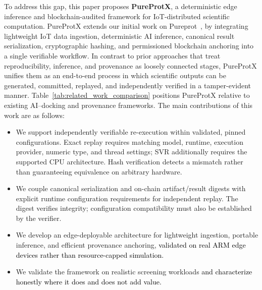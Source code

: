 \documentclass[conference]{IEEEtran}
\newcommand{\rev}[2]{#2}
\begin{document}
To address this gap, this paper proposes \textbf{PureProtX}, a deterministic edge inference and blockchain-audited framework for IoT-distributed scientific computation. PureProtX extends our initial work on Pureprot~\cite{kanu2025pureprot}, by integrating lightweight IoT data ingestion, deterministic AI inference, canonical result serialization, cryptographic hashing, and permissioned blockchain anchoring into a single verifiable workflow. In contrast to prior approaches that treat reproducibility, inference, and provenance as loosely connected stages, PureProtX unifies them as an end-to-end process in which scientific outputs can be generated, committed, replayed, and independently verified in a tamper-evident manner. Table~\ref{tab:related_work_comparison} positions PureProtX relative to existing AI--docking and provenance frameworks.
The main contributions of this work are as follows:  
\begin{itemize}
    \item \rev{R1.1}{We support independently verifiable re-execution
    within validated, pinned configurations. Exact replay requires
    matching model, runtime, execution provider, numeric type, and
    thread settings; SVR additionally requires the supported CPU
    architecture. Hash verification detects a mismatch rather than
    guaranteeing equivalence on arbitrary hardware.}

    \item \rev{R1.1}{We couple canonical serialization and
    on-chain artifact/result digests with explicit runtime
    configuration requirements for independent replay. The digest
    verifies integrity; configuration compatibility must also
    be established by the verifier.}
    \item We develop an edge-deployable architecture for
    lightweight ingestion, portable inference, and efficient
    provenance anchoring, \textcolor{black}{validated on real ARM
    edge devices rather than resource-capped simulation.}
    \item We validate the framework on realistic screening
    workloads \textcolor{black}{and characterize honestly where
    it does and does not add value.}
\end{itemize}
\end{document}
